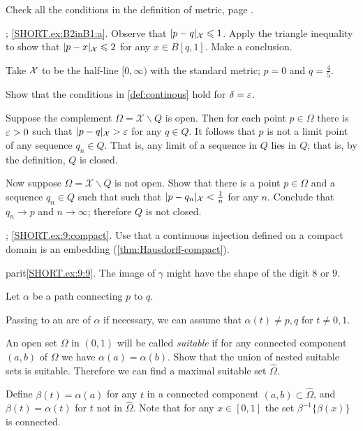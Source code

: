 \setcounter{eqtn}{0}

 Check all the conditions in the definition of metric, page \pageref{page:def:metric}.

\parbf{\ref{ex:B2inB1}}; \ref{SHORT.ex:B2inB1:a}.
Observe that $|p-q|_{\mathcal{X}}\leqslant 1$. 
Apply the triangle inequality to show that $|p-x|_{\mathcal{X}}\leqslant 2$ for any $x\in B[q,1]$.
Make a conclusion.

 Take $\mathcal{X}$ to be the half-line $[0,\infty)$ with the standard metric; $p=0$ and $q=\tfrac45$.

 Show that the conditions in \ref{def:continous} hold for $\delta=\varepsilon$.

Suppose the complement $\Omega=\mathcal{X}\backslash Q$ is open.
Then for each point $p\in \Omega$ there is $\varepsilon>0$ such that $|p-q|_{\mathcal{X}}>\varepsilon$ for any $q\in Q$.
It follows that $p$ is not a limit point of any sequence $q_n\in Q$.
That is, any limit of a sequence in $Q$ lies in $Q$;
that is, by the definition, $Q$ is closed.

Now suppose $\Omega=\mathcal{X}\backslash Q$ is not open.
Show that there is a point $p\in \Omega$ and a sequence $q_n\in Q$ such that such that $|p-q_n|_{\spc{X}}\z<\tfrac 1n$ for any $n$.
Conclude that $q_n\to p$ and $n\to \infty$;
therefore $Q$ is not closed.

\setcounter{eqtn}{0}

\parbf{\ref{ex:9}}; \ref{SHORT.ex:9:compact}. Use that a continuous injection defined on a compact domain is an embedding (\ref{thm:Hausdorff-compact}).

parit{\ref{SHORT.ex:9:9}.} The image of $\gamma$ might have the shape of the digit $8$ or $9$.



Let $\alpha$ be a path connecting $p$ to $q$.

Passing to an arc of $\alpha$ if necessary,
we can assume that $\alpha(t)\ne p,q$ for $t\ne0,1$.

An open set $\Omega$ in $(0,1)$ will be called {}\emph{suitable}
if for any connected component $(a,b)$ of $\Omega$ we have $\alpha(a)=\alpha(b)$.
Show that the union of nested suitable sets is suitable.
Therefore we can find a maximal suitable set $\hat \Omega$.

Define $\beta(t)=\alpha(a)$ for any $t$ in a connected component $(a,b)\subset\hat \Omega$, and $\beta (t) = \alpha (t) $ for $t$ not in $\hat{\Omega}$.
Note that for any $x\in [0,1]$ the set $\beta^{-1}\{\beta(x)\}$ is connected.

